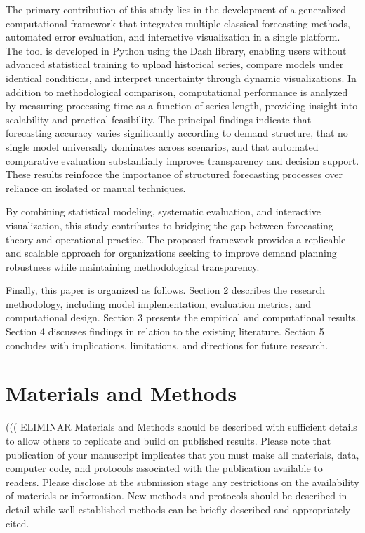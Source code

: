 \documentclass[journal,article,submit,pdftex,moreauthors]{Definitions/mdpi}
\begin{document}
The primary contribution of this study lies in the development of a generalized computational framework that integrates multiple classical forecasting methods, automated error evaluation, and interactive visualization in a single platform. The tool is developed in Python using the Dash library, enabling users without advanced statistical training to upload historical series, compare models under identical conditions, and interpret uncertainty through dynamic visualizations.
In addition to methodological comparison, computational performance is analyzed by measuring processing time as a function of series length, providing insight into scalability and practical feasibility. The principal findings indicate that forecasting accuracy varies significantly according to demand structure, that no single model universally dominates across scenarios, and that automated comparative evaluation substantially improves transparency and decision support. These results reinforce the importance of structured forecasting processes over reliance on isolated or manual techniques.

By combining statistical modeling, systematic evaluation, and interactive visualization, this study contributes to bridging the gap between forecasting theory and operational practice. The proposed framework provides a replicable and scalable approach for organizations seeking to improve demand planning robustness while maintaining methodological transparency.

Finally, this paper is organized as follows. Section 2 describes the research methodology, including model implementation, evaluation metrics, and computational design. Section 3 presents the empirical and computational results. Section 4 discusses findings in relation to the existing literature. Section 5 concludes with implications, limitations, and directions for future research.

\section{Materials and Methods}
((( ELIMINAR
Materials and Methods should be described with sufficient details to allow others to replicate and build on published results. Please note that publication of your manuscript implicates that you must make all materials, data, computer code, and protocols associated with the publication available to readers. Please disclose at the submission stage any restrictions on the availability of materials or information. New methods and protocols should be described in detail while well-established methods can be briefly described and appropriately cited.
\end{document}
